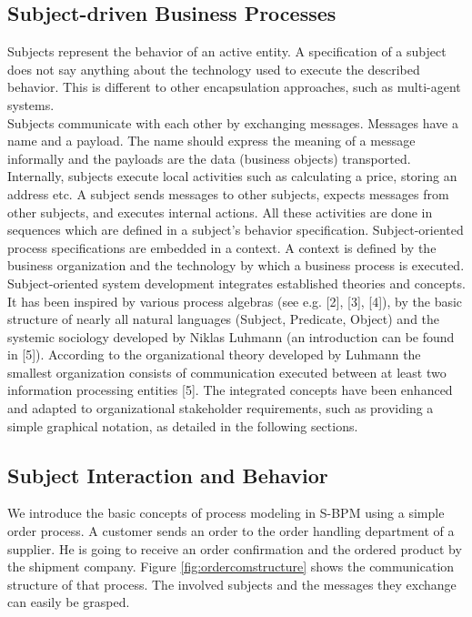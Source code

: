 \subsection{Subject-driven Business Processes}
Subjects represent the behavior of an active entity. A specification of a subject does not say anything about the technology used to execute the described behavior. This is different to other encapsulation approaches, such as multi-agent systems.\\ 

Subjects communicate with each other by exchanging messages. Messages have a name and a payload. The name should express the meaning of a message informally and the payloads are the data (business objects) transported. Internally, subjects execute local activities such as calculating a price, storing an address etc.
A subject sends messages to other subjects, expects messages from other subjects, and executes internal actions. All these activities are done in sequences which are defined in a subject's behavior specification.
Subject-oriented process specifications are embedded in a context. A context is defined by the business organization and the technology by which a business process is executed.
Subject-oriented system development integrates established theories and concepts. It has been inspired by various process algebras (see e.g. [2], [3], [4]), by the basic structure of nearly all natural languages (Subject, Predicate, Object) and the systemic sociology developed by Niklas Luhmann (an introduction can be found in [5]). According to the organizational theory developed by Luhmann the smallest organization consists of communication executed between at least two information processing entities [5]. The integrated concepts have been enhanced and adapted to organizational stakeholder requirements, such as providing a simple graphical notation, as detailed in the following sections.
\newpage

\subsection{Subject Interaction and Behavior}
We introduce the basic concepts of process modeling in S-BPM using a simple order process. A customer sends an order to the order handling department of a supplier. He is going to receive an order confirmation and the ordered product by the shipment company. Figure \ref{fig:ordercomstructure} shows the communication structure of that process. The involved subjects and the messages they exchange can easily be grasped. 

